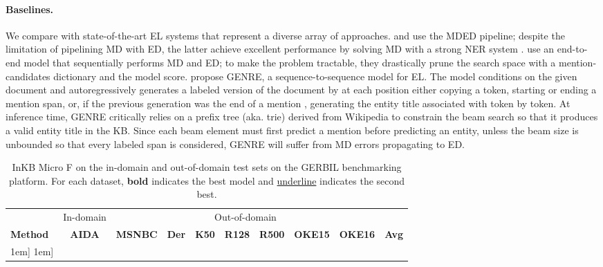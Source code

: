 \documentclass{article} \clearpage{}\usepackage{amsmath,amssymb,amsthm,bbm}
\newcommand{\ul}{\underline}
\theoremstyle{definition}
\begin{document}
\paragraph{Baselines.}
We compare with state-of-the-art EL systems that represent a diverse array of approaches.
\cite{hoffart2011robust} and \cite{van2020rel} use the MDED pipeline; despite the limitation of pipelining MD with ED,
the latter achieve excellent performance by solving MD with a strong NER system \citep{akbik2018contextual}.
\cite{kolitsas2018end} use an end-to-end model that sequentially performs MD and ED; to make the problem tractable,
they drastically prune the search space with a mention-candidates dictionary and the model score.
\cite{cao2021autoregressive} propose GENRE, a sequence-to-sequence model for EL.
The model conditions on the given document and autoregressively generates a labeled version of the document by at each position
either copying a token, starting or ending a mention span, or, if the previous generation was the end of a mention ,
generating the entity title associated with  token by token.
At inference time, GENRE critically relies on a prefix tree (aka. trie) derived from Wikipedia to constrain
the beam search so that it produces a valid entity title in the KB.
Since each beam element must first predict a mention before predicting an entity, unless the beam size is unbounded so that every labeled span is considered,
GENRE will suffer from MD errors propagating to ED.

\begin{table}[t]
  \setlength{\tabcolsep}{4pt}
  \renewcommand{\arraystretch}{1.1}
  \caption{InKB Micro F on the in-domain and out-of-domain test sets on the GERBIL benchmarking platform.
    For each dataset, {\bf bold} indicates the best model and \ul{underline} indicates the second best.
  }
  \label{tab:main}
  \small
  \begin{center}
    \begin{tabular}{lcccccccc|c}
      \Xhline{2\arrayrulewidth}
      \rule{0pt}{1.1em}& In-domain & \multicolumn{7}{c}{Out-of-domain}  & \\
           \rule{0pt}{1.1em}{\bf Method} & {\bf AIDA} & {\bf MSNBC} & {\bf Der} & {\bf K50} & {\bf R128} & {\bf R500} & {\bf OKE15} & {\bf OKE16} & {\bf Avg} \\
           \hline\-1em]
      \hline  \-1em]
      \Xhline{2\arrayrulewidth}
    \end{tabular}
  \end{center}
\end{table}
\end{document}
